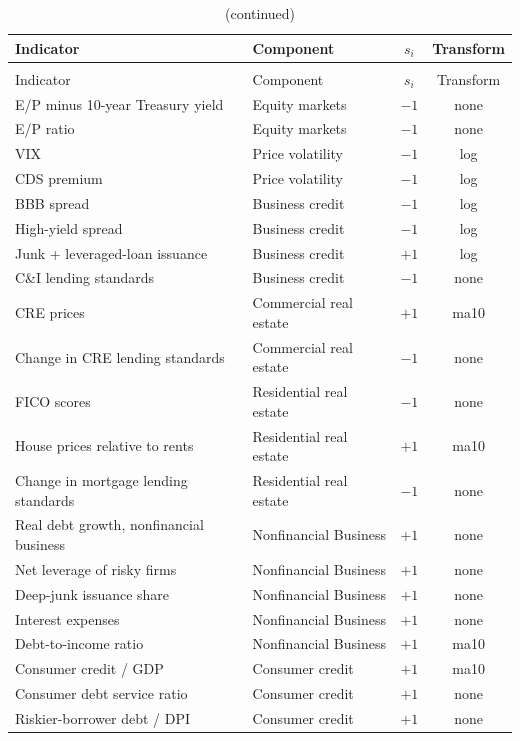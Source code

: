 \documentclass[11pt]{article}
\begin{document}
\begin{longtable}{llcc}
\caption{Per-indicator specification: component, sign $s_i$, transform.}
\label{tab:spec}\\
\toprule
Indicator & Component & $s_i$ & Transform \\
\midrule
\endfirsthead
\caption{(continued)}\\
\toprule
Indicator & Component & $s_i$ & Transform \\
\midrule
\endhead
E/P minus 10-year Treasury yield & Equity markets & $-1$ & none \\
E/P ratio & Equity markets & $-1$ & none \\
VIX & Price volatility & $-1$ & log \\
CDS premium & Price volatility & $-1$ & log \\
BBB spread & Business credit & $-1$ & log \\
High-yield spread & Business credit & $-1$ & log \\
Junk + leveraged-loan issuance & Business credit & $+1$ & log \\
C\&I lending standards & Business credit & $-1$ & none \\
CRE prices & Commercial real estate & $+1$ & ma10 \\
Change in CRE lending standards & Commercial real estate & $-1$ & none \\
FICO scores & Residential real estate & $-1$ & none \\
House prices relative to rents & Residential real estate & $+1$ & ma10 \\
Change in mortgage lending standards & Residential real estate & $-1$ & none \\
Real debt growth, nonfinancial business & Nonfinancial Business & $+1$ & none \\
Net leverage of risky firms & Nonfinancial Business & $+1$ & none \\
Deep-junk issuance share & Nonfinancial Business & $+1$ & none \\
Interest expenses & Nonfinancial Business & $+1$ & none \\
Debt-to-income ratio & Nonfinancial Business & $+1$ & ma10 \\
Consumer credit / GDP & Consumer credit & $+1$ & ma10 \\
Consumer debt service ratio & Consumer credit & $+1$ & none \\
Riskier-borrower debt / DPI & Consumer credit & $+1$ & none \\

\end{longtable}
\end{document}
